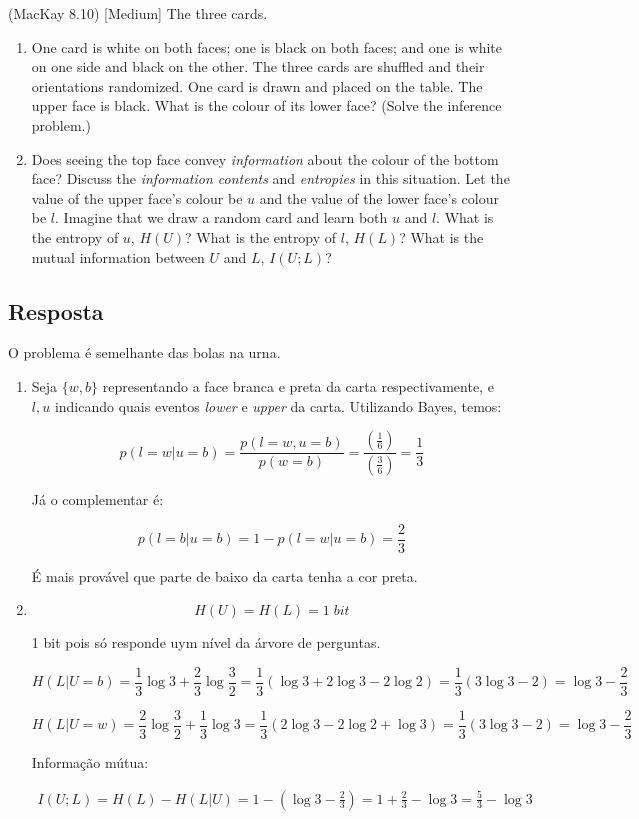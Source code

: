 (MacKay 8.10) [Medium]
The three cards.

\begin{enumerate}
    \item One card is white on both faces; one is black on both faces; and one is white on one side and black on the other. The three cards are shuffled and their orientations randomized. One card is drawn and placed on the table. The upper face is black. What is the colour of its lower face? (Solve the inference problem.)
    
    \item Does seeing the top face convey \textit{information} about the colour of the bottom face? Discuss the \textit{information contents} and \textit{entropies} in this situation. Let the value of the upper face's colour be $u$ and the value of the lower face's colour be $l$. Imagine that we draw a random card and learn both $u$ and $l$. What is the entropy of $u$, $H(U)$? What is the entropy of $l$, $H(L)$? What is the mutual information between $U$ and $L$, $I(U;L)$?
\end{enumerate}

\subsection*{Resposta}

O problema é semelhante das bolas na urna.

\begin{enumerate}
    \item
    Seja $\{w, b\}$ representando a face branca e preta da carta respectivamente, e $l, u$ indicando quais eventos \textit{lower} e \textit{upper} da carta. Utilizando Bayes, temos:
    
    \[p(l = w|u = b) = \frac{{p(l = w,u = b)}}{{p(w = b)}} = \frac{{\left( {\frac{1}{6}} \right)}}{{\left( {\frac{3}{6}} \right)}} = \frac{1}{3}\]
    
    Já o complementar é:
    
    \[p(l = b|u = b) = 1 - p(l = w|u = b) = \frac{2}{3}\]
    
    É mais provável que parte de baixo da carta tenha a cor preta.
    \bigskip
    
    \item
    \[H(U) = H(L) = 1\;bit\]
    
    1 bit pois só responde uym nível da árvore de perguntas.
    
    \[H(L|U = b) = \frac{1}{3}\log 3 + \frac{2}{3}\log \frac{3}{2} = \frac{1}{3}\left( {\log 3 + 2\log 3 - 2\log 2} \right) = \frac{1}{3}(3\log 3 - 2) = \log 3 - \frac{2}{3}\]
    
    \[H(L|U = w) = \frac{2}{3}\log \frac{3}{2} + \frac{1}{3}\log 3 = \frac{1}{3}(2\log 3 - 2\log 2 + \log 3) = \frac{1}{3}(3\log 3 - 2) = \log 3 - \frac{2}{3}\]
    
    Informação mútua:
    
    \[\begin{array}{l}
    I(U;L) = H(L) - H(L|U) = 1 - \left( {\log 3 - \frac{2}{3}} \right) = 1 + \frac{2}{3} - \log 3 = \frac{5}{3} - \log 3
    \end{array}\]
    
\end{enumerate}